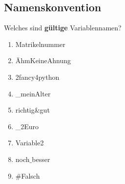 \subsection{Namenskonvention}
Welches sind \textbf{gültige} Variablennamen?
\begin{multicols}{3}
\begin{enumerate}
	\item Matrikelnummer
	\item ÄhmKeineAhnung
	\item 2fancy4python
	\item {\_}meinAlter
	\item richtig\&gut
	\item {\_}2Euro
	\item Variable2
	\item noch$\_$besser
	\item \#Falsch
\end{enumerate}
\end{multicols}